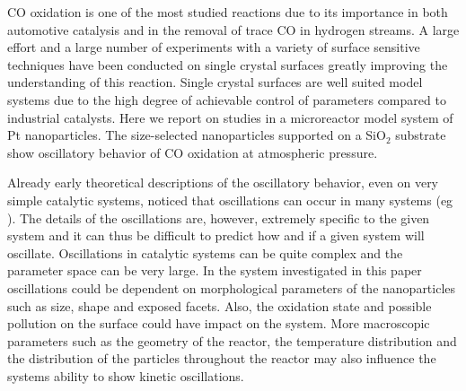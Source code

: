 \documentclass[8.5pt,twoside,twocolumn]{article}
\begin{document}




CO oxidation is one of the most studied reactions due to its importance in both automotive catalysis and in the removal of trace CO in hydrogen streams. A large effort and a large number of experiments with a variety of surface sensitive techniques have been conducted on single crystal surfaces greatly improving the understanding of this reaction. Single crystal surfaces are well suited model systems due to the high degree of achievable control of parameters compared to industrial catalysts. Here we report on studies in a microreactor model system of Pt nanoparticles. The size-selected nanoparticles supported on a SiO$_2$ substrate show oscillatory behavior of CO oxidation at atmospheric pressure.

Already early theoretical descriptions of the oscillatory behavior, even on very simple catalytic systems, noticed that oscillations can occur in many systems (eg \cite{LAGOS1979,IVANOV1980,TAKOUDIS1981,SONG1991}). The details of the oscillations are, however, extremely specific to the given system and it can thus be difficult to predict how and if a given system will oscillate. Oscillations in catalytic systems can be quite complex and the parameter space can be very large\cite{Ferino1999}. In the system investigated in this paper oscillations could be dependent on morphological parameters of the nanoparticles such as size, shape and exposed facets. Also, the oxidation state and possible pollution on the surface could have impact on the system. More macroscopic parameters such as the geometry of the reactor, the temperature distribution and the distribution of the particles throughout the reactor may also influence the systems ability to show kinetic oscillations.
\end{document}
